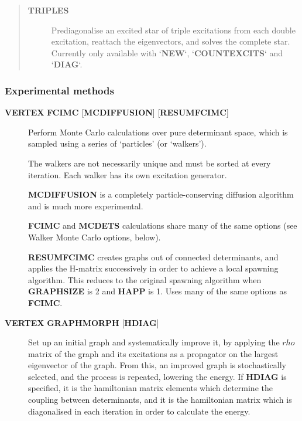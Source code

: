 \documentclass[openany,a4paper,10pt]{manual}
\begin{document}
\begin{description}
\begin{quote}
\begin{description}
\item[\textbf{TRIPLES}]
Prediagonalise an excited star of triple excitations from each
double excitation, reattach the eigenvectors, and solves
the complete star. Currently only available with `\textbf{NEW}`,
`\textbf{COUNTEXCITS}` and `\textbf{DIAG}`.

\end{description}
\end{quote}

\end{description}


\subsubsection{Experimental methods}
\begin{description}
\item[\textbf{VERTEX} \textbf{FCIMC} {[}\textbf{MCDIFFUSION}{]} {[}\textbf{RESUMFCIMC}{]}]
Perform Monte Carlo calculations over pure determinant space, which
is sampled using a series of `particles' (or `walkers').

The walkers are not necessarily unique and must be sorted at every
iteration.  Each walker has its own excitation generator.

\textbf{MCDIFFUSION} is a completely particle-conserving diffusion
algorithm and is much more experimental.

\textbf{FCIMC} and \textbf{MCDETS} calculations share many of the same options
(see Walker Monte Carlo options, below).

\textbf{RESUMFCIMC} creates graphs out of connected determinants, and applies
the H-matrix successively in order to achieve a local spawning algorithm.
This reduces to the original spawning algorithm when \textbf{GRAPHSIZE} is 2 and
\textbf{HAPP} is 1. Uses many of the same options as \textbf{FCIMC}.

\item[\textbf{VERTEX} \textbf{GRAPHMORPH} {[}\textbf{HDIAG}{]}]
Set up an initial graph and systematically improve it, by applying the
$rho$ matrix of the graph and its excitations as a propagator
on the largest eigenvector of the graph. From this, an improved graph
is stochastically selected, and the process is repeated, lowering
the energy. If \textbf{HDIAG} is specified, it is the hamiltonian matrix
elements which determine the coupling between determinants, and it
is the hamiltonian matrix which is diagonalised in each iteration
in order to calculate the energy.


\end{description}
\end{document}
